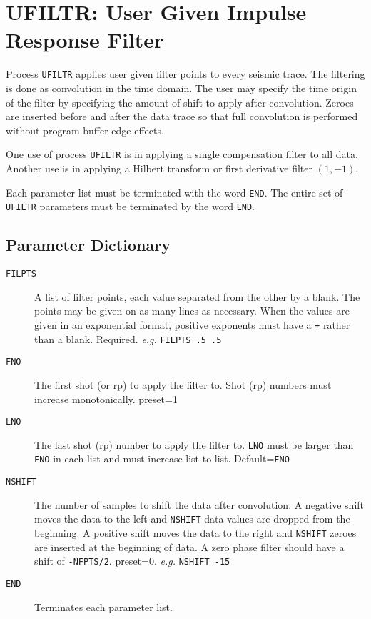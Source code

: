 \section{UFILTR: User Given Impulse Response Filter}
\label{cmd_ufiltr}

Process \texttt{UFILTR} applies user given filter points to every seismic trace.
The filtering is done as convolution in the time domain. The user may
specify the time origin of the filter by specifying the amount of shift
to apply after convolution.  Zeroes are inserted before and after the
data trace so that full convolution is performed without program buffer
edge effects.

One use of process \texttt{UFILTR} is in applying a single compensation filter
to all data.  Another use is in applying a Hilbert transform or first
derivative filter $(1,-1)$.

Each parameter list must be terminated with the word \texttt{END}.  The entire
set of \texttt{UFILTR} parameters must be terminated by the word \texttt{END}.

\subsection{Parameter Dictionary}

\begin{description}
\item[\texttt{FILPTS}] A list of filter points, each value separated from the other
         by a blank.  The points may be given on as many lines as
         necessary. When the values are given in an exponential format,
         positive exponents must have a \texttt{+} rather than a blank.
         Required. \textit{e.g.} \texttt{FILPTS .5 .5}

\item[\texttt{FNO}] The first \gls{shot} (or \gls{rp}) to apply the filter to.  Shot (\gls{rp})
         numbers must increase monotonically.
         \Gls{preset}=1

\item[\texttt{LNO}] The last \gls{shot} (\gls{rp}) number to apply the filter to.  \texttt{LNO} must be
         larger than \texttt{FNO} in each list and must increase list to list.
         Default=\texttt{FNO}

\item[\texttt{NSHIFT}] The number of samples to shift the data after convolution.  A
         negative shift moves the data to the left and \texttt{NSHIFT} data
         values are dropped from the beginning.  A positive shift moves
         the data to the right and \texttt{NSHIFT} zeroes are inserted at the
         beginning of data.  A zero phase filter should have a shift of
         \texttt{-NFPTS/2}.
         \Gls{preset}=0. \textit{e.g.} \texttt{NSHIFT -15}

\item[\texttt{END}] Terminates each parameter list.
\end{description}

